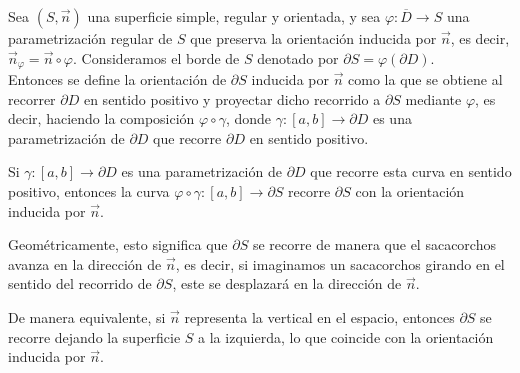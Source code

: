 \begin{definición} 
Sea \( (S, \vec{n}) \) una superficie simple, regular y orientada, y sea \( \varphi : \overline{D} \to S \) una parametrización regular de \( S \) que preserva la orientación inducida por \( \vec{n} \), es decir, \( \vec{n}_\varphi = \vec{n} \circ \varphi \). Consideramos el borde de \( S \) denotado por \( \partial S = \varphi(\partial D) \).\\
Entonces se define la orientación de \( \partial S \) inducida por \( \vec{n} \) como la que se obtiene al recorrer \( \partial D \) en sentido positivo y proyectar dicho recorrido a \( \partial S \) mediante \( \varphi \), es decir, haciendo la composición \( \varphi \circ \gamma \), donde \( \gamma : [a,b] \to \partial D \) es una parametrización de \( \partial D \) que recorre \( \partial D \) en sentido positivo.
\end{definición}

\begin{observación}
Si \( \gamma : [a,b] \to \partial D \) es una parametrización de \( \partial D \) que recorre esta curva en sentido positivo, entonces la curva \( \varphi \circ \gamma : [a,b] \to \partial S \) recorre \( \partial S \) con la orientación inducida por \( \vec{n} \).

Geométricamente, esto significa que \( \partial S \) se recorre de manera que
el sacacorchos avanza en la dirección de \( \vec{n} \), es decir, si imaginamos
un sacacorchos girando en el sentido del recorrido de \( \partial S \), este se
desplazará en la dirección de \( \vec{n} \).

De manera equivalente, si \( \vec{n} \) representa la vertical en el espacio,
entonces \( \partial S \) se recorre dejando la superficie \( S \) a la
izquierda, lo que coincide con la orientación inducida por \( \vec{n} \).
\end{observación}

